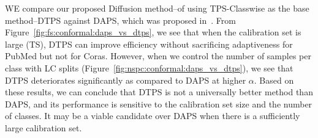 WE compare our proposed Diffusion method--of using TPS-Classwise as the base method--DTPS against DAPS, which was proposed in~\cite{zargarbashi23conformal}.
From Figure~\ref{fig:fs:conformal:daps_vs_dtps}, we see that when the calibration set is large (TS), DTPS can improve efficiency without sacrificing adaptiveness for PubMed but not for Coras.
However, when we control the number of samples per class with LC splits (Figure~\ref{fig:nspc:conformal:daps_vs_dtps}), we see that DTPS deteriorates significantly as compared to DAPS at higher $\alpha$.
Based on these results, we can conclude that DTPS is not a universally better method than DAPS, and its performance is sensitive to the calibration set size and the number of classes.
It may be a viable candidate over DAPS when there is a sufficiently large calibration set.